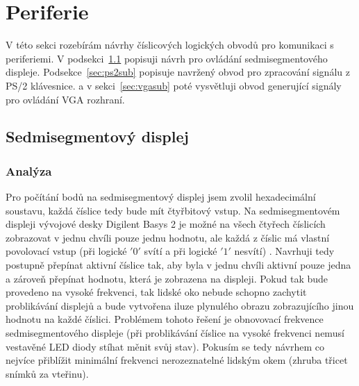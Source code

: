 \documentclass{report}
\begin{document}
\section{Periferie}\label{sec:periferie}
V této sekci rozebírám návrhy číslicových logických obvodů pro komunikaci s periferiemi. V podsekci~\ref{sec:sedmisegmentdisplej} popisuji návrh pro ovládání sedmisegmentového displeje. Podsekce~\ref{sec:ps2sub} popisuje navržený obvod pro zpracování signálu z PS/2 klávesnice. a v sekci~\ref{sec:vgasub} poté vysvětluji obvod generující signály pro ovládání VGA rozhraní.

\subsection{Sedmisegmentový displej}\label{sec:sedmisegmentdisplej}
\subsubsection{Analýza}
Pro počítání bodů na sedmisegmentový displej jsem zvolil hexadecimální soustavu, každá číslice tedy bude mít čtyřbitový vstup. Na sedmisegmentovém displeji vývojové desky Digilent Basys 2 je možné na všech čtyřech číslicích zobrazovat v jednu chvíli pouze jednu hodnotu, ale každá z číslic má vlastní povolovací vstup (při logické $'0'$ svítí a při logické $'1'$ nesvítí) . Navrhuji tedy postupně přepínat aktivní číslice tak, aby byla v jednu chvíli aktivní pouze jedna a zároveň přepínat hodnotu, která je zobrazena na displeji. Pokud tak bude provedeno na vysoké frekvenci, tak lidské oko nebude schopno zachytit problikávání displejů a bude vytvořena iluze plynulého obrazu zobrazujícího jinou hodnotu na každé číslici. Problémem tohoto řešení je obnovovací frekvence sedmisegmentového displeje (při problikávání číslice na vysoké frekvenci nemusí vestavěné LED diody stíhat měnit svůj stav). Pokusím se tedy návrhem co nejvíce přiblížit minimální frekvenci nerozeznatelné lidským okem (zhruba třicet snímků za vteřinu).
\end{document}
